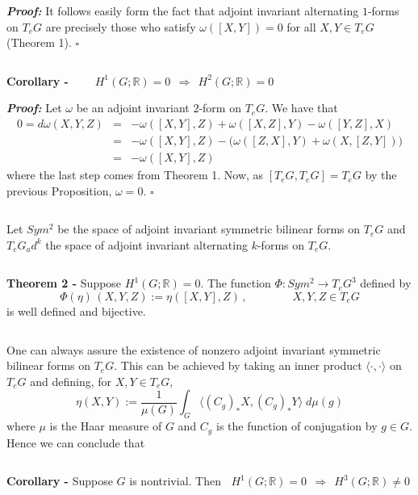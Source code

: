 \documentclass[12pt]{article}
\begin{document}
{\bf \emph{Proof:}} It follows easily form the fact that adjoint invariant alternating $1$-forms on $T_eG$ are precisely those who satisfy $\omega([X,Y]) = 0$ for all $X, Y \in T_eG$ (Theorem 1). $\square$

$\,$

{\bf Corollary -} $\qquad H^1(G;\mathbb{R}) = 0 \;\, \Longrightarrow \;\, H^2(G;\mathbb{R})=0$

{\bf \emph{Proof:}} Let $\omega$ be an adjoint invariant $2$-form on $T_eG$. We have that
\begin{eqnarray*}
0 = d\omega(X, Y, Z) & = & -\omega([X,Y],Z) + \omega([X,Z],Y) - \omega([Y,Z],X)\\
& = & -\omega([X,Y],Z) - \Big( \omega([Z, X],Y) + \omega(X,[Z,Y]) \Big)\\
& = & -\omega([X,Y],Z)
\end{eqnarray*}
where the last step comes from Theorem 1. Now, as $[T_eG, T_eG] = T_eG$ by the previous Proposition, $\omega = 0$. $\square$

$\,$

Let $Sym^2$ be the space of adjoint invariant symmetric bilinear forms on $T_eG$ and $T_eG_ad^k$ the space of adjoint invariant alternating $k$-forms on $T_eG$.

$\,$

{\bf Theorem 2 - } Suppose $H^1(G;\mathbb{R})=0$. The function $\Phi : Sym^2 \longrightarrow T_eG^3$ defined by
\begin{displaymath}
\Phi(\eta)\,(X,Y,Z) := \eta([X,Y],Z)\,, \qquad\qquad X,Y,Z \in T_eG
\end{displaymath}
is well defined and bijective.

$\,$

One can always assure the existence of nonzero adjoint invariant symmetric bilinear forms on $T_eG$. This can be achieved by taking an inner product $\langle \cdot , \cdot \rangle$ on $T_eG$ and defining, for $X,Y \in T_eG$,
\begin{displaymath}
\eta(X,Y):= \frac{1}{\mu(G)}\int_G \langle (C_g)_* X , (C_g)_* Y \rangle \;d\mu(g)
\end{displaymath}
where $\mu$ is the Haar measure of $G$ and $C_g$ is the function of conjugation by $g \in G$. Hence we can conclude that

$\,$

{\bf Corollary -} Suppose $G$ is nontrivial. Then $\;\; H^1(G;\mathbb{R}) = 0 \;\, \Longrightarrow \;\, H^3(G;\mathbb{R})\neq0$


\end{document}
